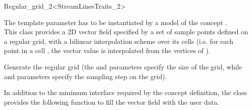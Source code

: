 

\begin{ccRefClass}{Regular_grid_2<StreamLinesTraits_2>}  %

\ccDefinition
  
The template parameter  has to be
instantiated by a model of the concept .\\
This class provides a 2D vector field specified by a set of sample points defined on a regular
grid, with a bilinear interpolation scheme over its cells (i.e. for each point  in a cell , the vector value is interpolated from the vertices of ).

\ccCreation
{}  %

\ccThreeToTwo

\ccThreeToTwo
{}
{Generate the regular grid \ccVar (the  and  parameters specify the size of the grid, while  and  parameters specify the sampling step on the grid).}

In addition to the minimum interface required by the concept
definition, the class \ccRefName  provides the following function to
fill the vector field with the user data.




\ccIsModel 

 \\

\ccSeeAlso
{} \\
\end{ccRefClass}


